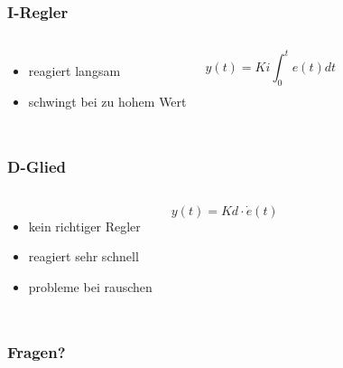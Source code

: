 \documentclass[12pt,a4paper, ngerman]{beamer}
\begin{document}
\begin{frame}
\frametitle{I-Regler}
\begin{columns}
\begin{itemize}
\item reagiert langsam
\item schwingt bei zu hohem Wert
\end{itemize}
\begin{equation*}
y(t)=Ki\int_{0}^{t}e(t)dt
\end{equation*}
\end{columns}
\end{frame}

\begin{frame}
\frametitle{D-Glied}
\begin{columns}
\begin{itemize}
\item kein richtiger Regler
\item reagiert sehr schnell
\item probleme bei rauschen
\end{itemize}
\begin{equation*}
y(t)=Kd\cdot \dot{e}(t)
\end{equation*}
\end{columns}
\end{frame}


\begin{frame}
\frametitle{Fragen?}
\end{frame}
\end{document}
